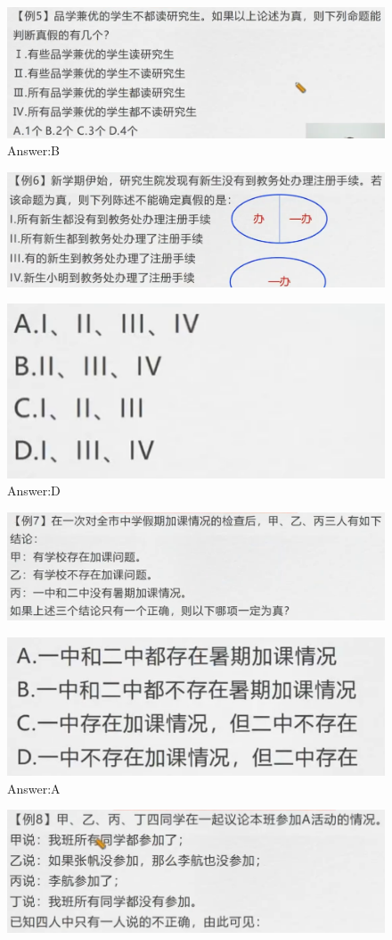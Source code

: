\documentclass{article}
\numberwithin{equation}{section}						%
\numberwithin{figure}{section}							%
\begin{document}
\begin{sloppypar}
\begin{figure}[H]
     \centering
     \includegraphics[width=0.6\linewidth]{176.png}
		\caption{Answer:B}
\end{figure}


\begin{figure}[H]
     \centering
     \includegraphics[width=0.6\linewidth]{177.png}
	
\end{figure}

\begin{figure}[H]
     \centering
     \includegraphics[width=0.3\linewidth]{178.png}
		\caption{Answer:D}
\end{figure}

\begin{figure}[H]
     \centering
     \includegraphics[width=0.6\linewidth]{179.png}
	
\end{figure}

\begin{figure}[H]
     \centering
     \includegraphics[width=0.35\linewidth]{180.png}
		\caption{Answer:A}
\end{figure}


\begin{figure}[H]
     \centering
     \includegraphics[width=0.6\linewidth]{181.png}
	

\end{figure}
\end{sloppypar}
\end{document}
